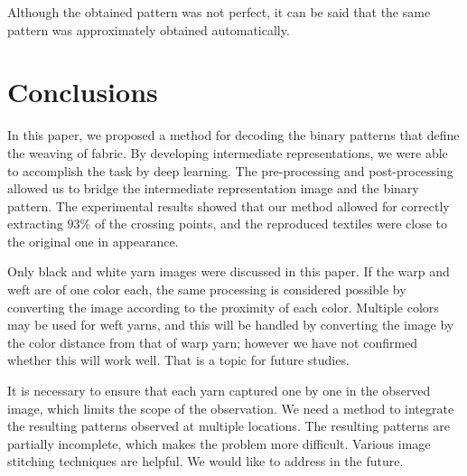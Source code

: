 Although the obtained pattern was not perfect, it can be said that the same pattern was approximately obtained automatically. 

\section{Conclusions}
In this paper, we proposed a method for decoding the binary patterns that define the weaving of fabric. By developing intermediate representations, we were able to accomplish the task by deep learning. The pre-processing and post-processing allowed us to bridge the intermediate representation image and the binary pattern. The experimental results showed that our method allowed for correctly extracting $93\%$ of the crossing points, and the reproduced textiles were close to the original one in appearance. 

Only black and white yarn images were discussed in this paper. If the warp and weft are of one color each, the same processing is considered possible by converting the image according to the proximity of each color. Multiple colors may be used for weft yarns, and this will be handled by converting the image by the color distance from that of warp yarn; however we have not confirmed whether this will work well. That is a topic for future studies.

It is necessary to ensure that each  yarn  captured one by one in the observed image, which limits the scope of the observation. We need a method to integrate the resulting patterns observed at multiple locations. The resulting patterns are partially incomplete, which makes the problem more difficult. Various image stitching techniques are helpful.  
 We would like to address   in the future.


